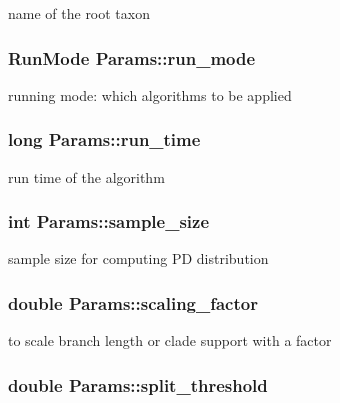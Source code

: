 name of the root taxon \hypertarget{structParams_a0ec421aba92e29bf97cc7b0e11480a24}{
\subsubsection[{run\_\-mode}]{\setlength{\rightskip}{0pt plus 5cm}RunMode {\bf Params::run\_\-mode}}}
\label{structParams_a0ec421aba92e29bf97cc7b0e11480a24}
running mode: which algorithms to be applied \hypertarget{structParams_a6bbf50b9c4d395aa45bc32030a7c5470}{
\subsubsection[{run\_\-time}]{\setlength{\rightskip}{0pt plus 5cm}long {\bf Params::run\_\-time}}}
\label{structParams_a6bbf50b9c4d395aa45bc32030a7c5470}
run time of the algorithm \hypertarget{structParams_a7da850df5469927efa827d3430774662}{
\subsubsection[{sample\_\-size}]{\setlength{\rightskip}{0pt plus 5cm}int {\bf Params::sample\_\-size}}}
\label{structParams_a7da850df5469927efa827d3430774662}
sample size for computing PD distribution \hypertarget{structParams_a34fce45414ecb0b1629ed858f02df0be}{
\subsubsection[{scaling\_\-factor}]{\setlength{\rightskip}{0pt plus 5cm}double {\bf Params::scaling\_\-factor}}}
\label{structParams_a34fce45414ecb0b1629ed858f02df0be}
to scale branch length or clade support with a factor \hypertarget{structParams_a8e5d88154702dd77ae3acc1244b6b0ac}{
\subsubsection[{split\_\-threshold}]{\setlength{\rightskip}{0pt plus 5cm}double {\bf Params::split\_\-threshold}}}
